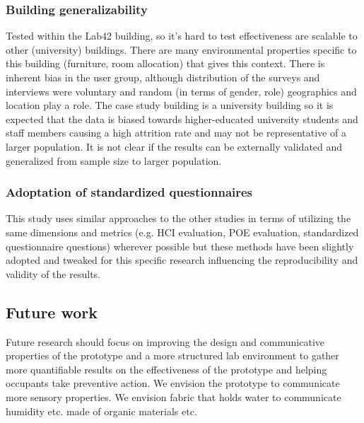 \subsubsection{Building generalizability}
Tested within the Lab42 building, so it's hard to test effectiveness are scalable to other (university) buildings. There are many environmental properties specific to this building (furniture, room allocation) that gives this context. There is inherent bias in the user group, although distribution of the surveys and interviews were voluntary and random (in terms of gender, role) geographics and location play a role. The case study building is a university building so it is expected that the data is biased towards higher-educated university students and staff members causing a high attrition rate and may not be representative of a larger population. It is not clear if the results can be externally validated and generalized from sample size to larger population.

\subsubsection{Adoptation of standardized questionnaires}

This study uses similar approaches to the other studies in terms of utilizing the same dimensions and metrics (e.g. HCI evaluation, POE evaluation, standardized questionnaire questions) wherever possible but these methods have been slightly adopted and tweaked for this specific research influencing the reproducibility and validity of the results.

\subsection{Future work}

Future research should focus on improving the design and communicative properties of the prototype and a more structured lab environment to gather more quantifiable results on the effectiveness of the prototype and helping occupants take preventive action. We envision the prototype to communicate more sensory properties. We envision fabric that holds water to communicate humidity etc. made of organic materials etc.